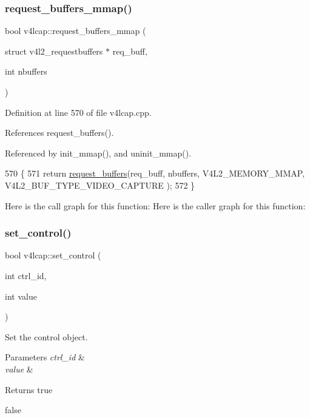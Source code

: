\subsubsection{\texorpdfstring{request\+\_\+buffers\+\_\+mmap()}{request\_buffers\_mmap()}}
{\footnotesize\ttfamily bool v4lcap\+::request\+\_\+buffers\+\_\+mmap (\begin{DoxyParamCaption}\item[{struct v4l2\+\_\+requestbuffers $\ast$}]{req\+\_\+buff,  }\item[{int}]{nbuffers }\end{DoxyParamCaption})}



Definition at line 570 of file v4lcap.\+cpp.



References request\+\_\+buffers().



Referenced by init\+\_\+mmap(), and uninit\+\_\+mmap().


\begin{DoxyCode}
570                                                                                      \{
571     \textcolor{keywordflow}{return} \hyperlink{classv4lcap_adfe2c7d6382e325a9f4e1ad699c01fc5}{request\_buffers}(req\_buff, nbuffers, V4L2\_MEMORY\_MMAP, V4L2\_BUF\_TYPE\_VIDEO\_CAPTURE
      );
572 \}
\end{DoxyCode}
Here is the call graph for this function\+:
Here is the caller graph for this function\+:
\mbox{\label{classv4lcap_a863a15d2d66cc0b7367dcc9cba64e0bd}} 
\subsubsection{\texorpdfstring{set\+\_\+control()}{set\_control()}}
{\footnotesize\ttfamily bool v4lcap\+::set\+\_\+control (\begin{DoxyParamCaption}\item[{int}]{ctrl\+\_\+id,  }\item[{int}]{value }\end{DoxyParamCaption})}



Set the control object. 


\begin{DoxyParams}{Parameters}
{\em ctrl\+\_\+id} & \\
\hline
{\em value} & \\
\hline
\end{DoxyParams}
\begin{DoxyReturn}{Returns}
true 

false 
\end{DoxyReturn}


